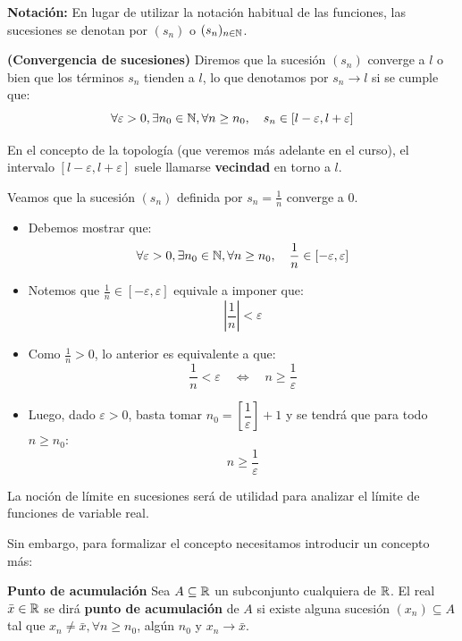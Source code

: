 \begin{nota}
	\textbf{Notación:} En lugar de utilizar la notación habitual de las funciones, las sucesiones se denotan por $(s_n)$ o $(s_n)_{n\in\mathbb{N}}$.  
\end{nota}

\begin{definicion}
	\textbf{(Convergencia de sucesiones)}
	Diremos que la sucesión $(s_n)$ converge a $l$ o bien que los términos $s_n$ tienden a $l$, lo que denotamos por $s_n \rightarrow l$ si se cumple que: 
	$$ \forall \varepsilon > 0, \exists n_0 \in \mathbb{N}, \forall n \geq n_0, \quad s_n \in [l - \varepsilon, l + \varepsilon] $$
\end{definicion}

\begin{nota}
	En el concepto de la topología (que veremos más adelante en el curso), el intervalo $ [l - \varepsilon, l + \varepsilon]$ suele llamarse \textbf{vecindad} en torno a $l$. 
\end{nota}


\begin{ejemplo}
	Veamos que la sucesión $(s_n)$ definida por $s_n = \frac{1}{n}$ converge a $0$.  
\end{ejemplo}

\begin{itemize}
	\item Debemos mostrar que: 
	$$ \forall \varepsilon > 0, \exists n_0 \in \mathbb{N}, \forall n \geq n_0, \quad \frac{1}{n} \in [- \varepsilon, \varepsilon] $$
	\item Notemos que $\frac{1}{n} \in [- \varepsilon, \varepsilon]$ equivale a imponer que: 
	$$ | \frac{1}{n} | < \varepsilon $$ 
	\item Como $\frac{1}{n}>0$, lo anterior es equivalente a que: 
	$$ \frac{1}{n} < \varepsilon \quad \iff \quad n \geq \frac{1}{\varepsilon}$$ 
	\item Luego, dado $\varepsilon > 0$, basta tomar $n_0 = \left[\dfrac{1}{\varepsilon}\right] + 1$ y se tendrá que para todo $n \geq n_0$: 
	$$  n \geq \frac{1}{\varepsilon} $$ 
\end{itemize}

La noción de límite en sucesiones será de utilidad para analizar el límite de funciones de variable real. 

\bigskip 	
Sin embargo, para formalizar el concepto necesitamos introducir un concepto más: 

\begin{definicion}{\textbf{Punto de acumulación}}
	Sea $A \subseteq \mathbb{R}$ un subconjunto cualquiera de $\mathbb{R}$. El real $\bar{x}\in \mathbb{R}$ se dirá \textbf{punto de acumulación} de  $A$ si existe alguna sucesión $(x_n) \subseteq A$ tal que $x_n \neq \bar{x}, \forall n \geq n_0$, algún $n_0$ y $x_n \rightarrow \bar{x}$. 
\end{definicion}


